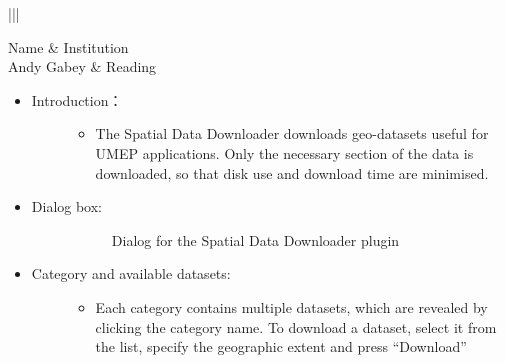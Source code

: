 \documentclass[letterpaper,10pt,english]{sphinxmanual}
\begin{document}
\begin{savenotes}\sphinxattablestart
\centering
\begin{tabular}[t]{|||}
\hline

Name
&
Institution
\\
\hline
Andy Gabey
&
Reading
\\
\hline
\end{tabular}
\par
\sphinxattableend\end{savenotes}
\begin{itemize}
\item {} \begin{description}
\item[{Introduction：}] \leavevmode\begin{itemize}
\item {} 
The Spatial Data Downloader downloads geo-datasets useful for UMEP applications. Only the necessary section of the data is downloaded, so that disk use and download time are minimised.

\end{itemize}

\end{description}

\item {} \begin{description}
\item[{Dialog box:}] \leavevmode
\begin{figure}[htbp]
\centering
\capstart

\noindent{}
\caption{Dialog for the Spatial Data Downloader plugin}\label{\detokenize{pre-processor/Spatial Data Spatial Data Downloader:id1}}\end{figure}

\end{description}

\item {} \begin{description}
\item[{Category and available datasets:}] \leavevmode\begin{itemize}
\item {} 
Each category contains multiple datasets, which are revealed by clicking the category name. To download a dataset, select it from the list, specify the geographic extent and press “Download”

\end{itemize}


\end{description}
\end{itemize}
\end{document}
